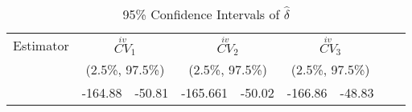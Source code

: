 \begin{table}[ht]
    \caption{95\% Confidence Intervals of $\hat{\delta}$}
    \centering
    \begin{tabular}{rrrrrrrrr}
      \hline
      Estimator&\multicolumn{2}{c}{$\overset{iv}{CV}_{1}$} &\multicolumn{2}{c}{$\overset{iv}{CV}_{2}$} &\multicolumn{2}{c}{$\overset{iv}{CV}_{3}$} \\
      &\multicolumn{2}{c}{(2.5\%, 97.5\%)} &\multicolumn{2}{c}{(2.5\%, 97.5\%)} &\multicolumn{2}{c}{(2.5\%, 97.5\%)}\\
      \hline
     & -164.88 & -50.81 & -165.661 & -50.02 & -166.86 & -48.83 \\ 
     \hline
    \end{tabular}
\end{table} 